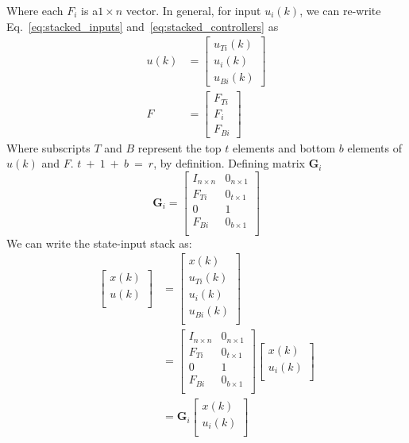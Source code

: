 Where each $F_i$ is a$ 1\times n$ vector. In general, for input $u_i\left(k\right)$, we can re-write Eq.~\ref{eq:stacked_inputs} and~\ref{eq:stacked_controllers} as
\begin{align}
    u(k) &= \left[\begin{matrix}
        u_{Ti}(k) \\
        u_i(k) \\
        u_{Bi}(k)
    \end{matrix}\right] \\
    F &= \left[\begin{matrix}
        F_{Ti} \\
        F_i \\
        F_{Bi}
    \end{matrix}\right]
\end{align}
Where subscripts $T$ and $B$ represent the top $t$ elements and bottom $b$ elements of $u\left(k\right)$ and $F$. $t\ +\ 1\ +\ b\ =\ r$, by definition. Defining matrix $\textbf{G}_i$
\begin{equation}
    \textbf{G}_i=\left[\begin{matrix}I_{n\times n}&0_{n\times1}\\F_{Ti}&0_{t\times1}\\0&1\\F_{Bi}&0_{b\times1}\\\end{matrix}\right]
\end{equation}
We can write the state-input stack as:
\begin{equation}
    \begin{split}
        \left[\begin{matrix}x\left(k\right)\\u\left(k\right)\\\end{matrix}\right]&=\left[\begin{matrix}x\left(k\right)\\u_{Ti}\left(k\right)\\u_i\left(k\right)\\u_{Bi}\left(k\right)\\\end{matrix}\right]\\&=\left[\begin{matrix}I_{n\times n}&0_{n\times1}\\F_{Ti}&0_{t\times1}\\0&1\\F_{Bi}&0_{b\times1}\\\end{matrix}\right]\left[\begin{matrix}x\left(k\right)\\u_i\left(k\right)\\\end{matrix}\right]\\&=\textbf{G}_i\left[\begin{matrix}x(k)\\u_i(k)\\\end{matrix}\right]
    \end{split}
\end{equation}
